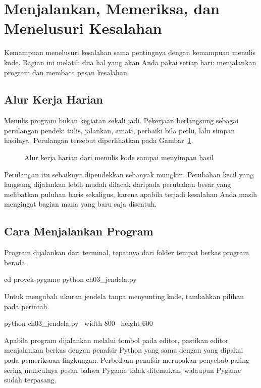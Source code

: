 \section{Menjalankan, Memeriksa, dan Menelusuri Kesalahan}
\label{sec:menelusuri-kesalahan}

Kemampuan menelusuri kesalahan sama pentingnya dengan kemampuan menulis kode.
Bagian ini melatih dua hal yang akan Anda pakai setiap hari: menjalankan
program dan membaca pesan kesalahan.

\subsection{Alur Kerja Harian}

Menulis program bukan kegiatan sekali jadi. Pekerjaan berlangsung sebagai
perulangan pendek: tulis, jalankan, amati, perbaiki bila perlu, lalu simpan
hasilnya. Perulangan tersebut diperlihatkan pada Gambar~\ref{fig:alur-kerja}.

\begin{figure}[htbp]
\centering

\caption{Alur kerja harian dari menulis kode sampai menyimpan hasil}
\label{fig:alur-kerja}
\end{figure}

Perulangan itu sebaiknya dipendekkan sebanyak mungkin. Perubahan kecil yang
langsung dijalankan lebih mudah dilacak daripada perubahan besar yang
melibatkan puluhan baris sekaligus, karena apabila terjadi kesalahan Anda
masih mengingat bagian mana yang baru saja disentuh.

\subsection{Cara Menjalankan Program}

Program dijalankan dari terminal, tepatnya dari folder tempat berkas program
berada.

\begin{kodekeluaran}
cd proyek-pygame\code
python ch03_jendela.py
\end{kodekeluaran}

Untuk mengubah ukuran jendela tanpa menyunting kode, tambahkan pilihan pada
perintah.

\begin{kodekeluaran}
python ch03_jendela.py --width 800 --height 600
\end{kodekeluaran}

Apabila program dijalankan melalui tombol pada editor, pastikan editor
menjalankan berkas dengan penafsir Python yang sama dengan yang dipakai pada
pemeriksaan lingkungan. Perbedaan penafsir merupakan penyebab paling sering
munculnya pesan bahwa Pygame tidak ditemukan, walaupun Pygame sudah terpasang.

